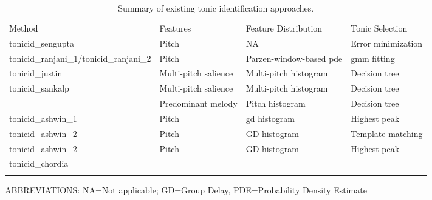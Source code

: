 \begin{table}
	\begin{threeparttable} 
		\begin{centering}
			\begin{tabular}{l L{4.5cm} L{4.5cm} L{3.5cm} }
				\tabletop			
				Method 	&	Features	&	Feature Distribution	&	Tonic Selection \\
				\tablemid			
				\acrshort{tonicid_sengupta} \citep{Sengupta2005b}	&	Pitch \citep{AKDatta_1996} & NA & Error minimization\\
				
				\acrshort{tonicid_ranjani_1}/\acrshort{tonicid_ranjani_2} \citep{ranjani2011carnatic}	&	Pitch \citep{BoersmaPaul2001} & Parzen-window-based \acrshort{pde}  & \acrshort{gmm} fitting\\
				
				\acrshort{tonicid_justin} \citep{salamon2012multipitch} & Multi-pitch salience \citep{Salamon2011} & Multi-pitch histogram & Decision tree\\
				
				\acrshort{tonicid_sankalp} \citep{gulati2012two}	& Multi-pitch salience  \citep{Salamon2011} & Multi-pitch histogram & Decision tree\\
				
				&	Predominant melody \citep{Salamon2012} & Pitch histogram & Decision tree\\
				
				\acrshort{tonicid_ashwin_1} \citep{bellur2012knowledge}	&	Pitch \citep{DeCheveigne2002}	&  \acrshort{gd} histogram & Highest peak\\
				
				\acrshort{tonicid_ashwin_2} \citep{bellur2012knowledge}	&	Pitch \citep{DeCheveigne2002}	& 	GD histogram	&
				Template matching\\
				
				\acrshort{tonicid_ashwin_2} \citep{bellur2012knowledge}	&	Pitch \citep{DeCheveigne2002}	& 	GD histogram
				& Highest peak\\
				
				\acrshort{tonicid_chordia} \citep{chordia2013joint}	& 	& 	& \\			
				
				\tablebot		
			\end{tabular}
			\par \end{centering}		
		\begin{tablenotes}
			\small
			\item[] ABBREVIATIONS: NA=Not applicable; GD=Group Delay, PDE=Probability Density Estimate
		\end{tablenotes}
			\caption[Summary of existing tonic identification approaches.]{Summary of existing tonic identification approaches.}
			\label{tab:pre_processing_tonic_identification_summary_methods}
	\end{threeparttable}
\end{table}

